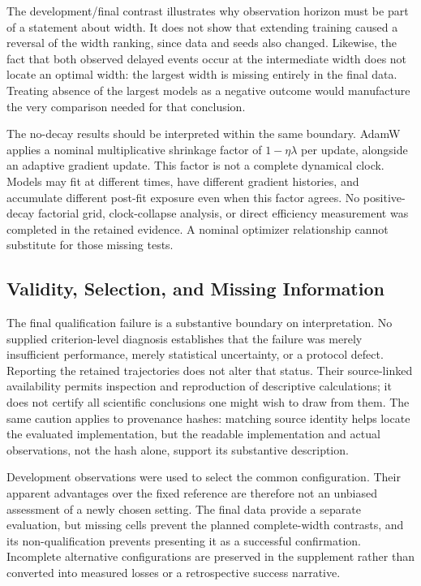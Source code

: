 \documentclass{article}
\begin{document}
The development/final contrast illustrates why observation horizon must be part of a statement about width. It does not show that extending training caused a reversal of the width ranking, since data and seeds also changed. Likewise, the fact that both observed delayed events occur at the intermediate width does not locate an optimal width: the largest width is missing entirely in the final data. Treating absence of the largest models as a negative outcome would manufacture the very comparison needed for that conclusion.

The no-decay results should be interpreted within the same boundary. AdamW applies a nominal multiplicative shrinkage factor of $1-\eta\lambda$ per update, alongside an adaptive gradient update. This factor is not a complete dynamical clock. Models may fit at different times, have different gradient histories, and accumulate different post-fit exposure even when this factor agrees. No positive-decay factorial grid, clock-collapse analysis, or direct efficiency measurement was completed in the retained evidence. A nominal optimizer relationship cannot substitute for those missing tests.

\subsection{Validity, Selection, and Missing Information}
The final qualification failure is a substantive boundary on interpretation. No supplied criterion-level diagnosis establishes that the failure was merely insufficient performance, merely statistical uncertainty, or a protocol defect. Reporting the retained trajectories does not alter that status. Their source-linked availability permits inspection and reproduction of descriptive calculations; it does not certify all scientific conclusions one might wish to draw from them. The same caution applies to provenance hashes: matching source identity helps locate the evaluated implementation, but the readable implementation and actual observations, not the hash alone, support its substantive description.

Development observations were used to select the common configuration. Their apparent advantages over the fixed reference are therefore not an unbiased assessment of a newly chosen setting. The final data provide a separate evaluation, but missing cells prevent the planned complete-width contrasts, and its non-qualification prevents presenting it as a successful confirmation. Incomplete alternative configurations are preserved in the supplement rather than converted into measured losses or a retrospective success narrative.
\end{document}
